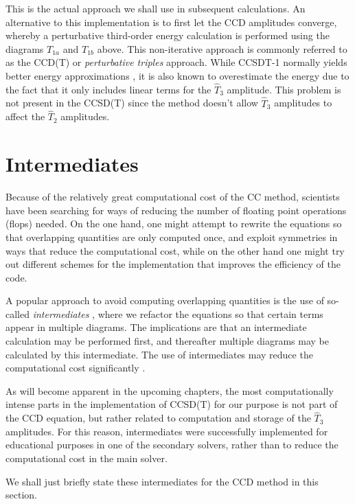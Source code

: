 This is the actual approach we shall use in subsequent
calculations. An alternative to this implementation is to first let
the CCD amplitudes converge, whereby a perturbative third-order energy
calculation is performed using the diagrams $T_{1a}$ and $T_{1b}$
above. This non-iterative approach is commonly referred to as the
CCD(T) or \emph{perturbative triples} approach. While CCSDT-1 normally
yields better energy approximations \cite[p.342]{ShavittBartlett2009},
it is also known to overestimate the energy due to the fact that it
only includes linear terms for the $\hat{T}_3$ amplitude. This problem is not
present in the CCSD(T) since the method doesn't allow $\hat{T}_3$ amplitudes to
affect the $\hat{T}_2$ amplitudes.


\section{Intermediates}

Because of the relatively great computational cost of the CC method,
scientists have been searching for ways of reducing the number of floating point operations (flops)
needed. On the one hand, one might attempt to rewrite the equations so
that overlapping quantities are only computed once, and
exploit symmetries in ways that reduce the computational cost, while
on the other hand one might try out different schemes for the
implementation that improves the efficiency of the code.

A popular approach to avoid computing overlapping quantities is the
use of so-called \emph{intermediates} \cite{CrawfordSchaefer}, where
we refactor the equations so that certain
terms appear in multiple diagrams. The implications are that
an intermediate calculation may be performed first, and thereafter
multiple diagrams may be calculated by this intermediate. The
use of intermediates may reduce the computational cost
significantly \cite{Baardsen2014}.

As will become apparent in the upcoming chapters, the most
computationally intense parts in the implementation of CCSD(T) for our
purpose is not part of the CCD equation, but rather related to
computation and storage of the $\hat{T}_3$ amplitudes. For this reason,
intermediates were successfully implemented for educational purposes in
one of the secondary solvers, rather than to reduce the computational
cost in the main solver.

We shall just briefly state these intermediates for the CCD method in this section.

